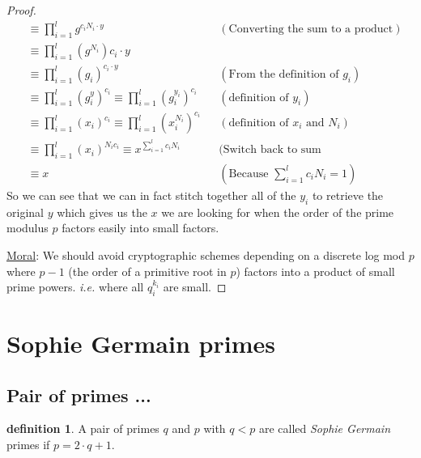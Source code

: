 \documentclass[10pt]{article}
\theoremstyle{definition}
\newtheorem{definition}[theorem]{definition}
\theoremstyle{remark}
\def\ul{\underline}
\begin{document}
\begin{proof}
\begin{align*}
&\equiv \prod_{i=1}^{l}g^{c_iN_i \cdot y} &&(\text{Converting the sum to a product})\\
&\equiv \prod_{i=1}^{l}(g^{N_i}){c_i \cdot y}\\
&\equiv \prod_{i=1}^{l}(g_i)^{c_i \cdot y} &&(\text{From the definition of $g_i$})\\
&\equiv \prod_{i=1}^{l}(g_i^y)^{c_i} \equiv \prod_{i=1}^{l}(g_i^{y_i})^{c_i} &&(\text{definition of $y_i$})\\
&\equiv \prod_{i=1}^{l}(x_i)^{c_i} \equiv \prod_{i=1}^{l}(x_i^{N_i})^{c_i} &&(\text{definition of $x_i$ and $N_i$})\\
&\equiv \prod_{i=1}^{l}(x_i)^{N_ic_i} \equiv x^{\sum_{i=1}^{l}c_iN_i} &&(\text{Switch back to sum}\\
&\equiv x &&(\text{Because $\sum_{i=1}^{l}c_iN_i = 1$})
\end{align*}
So we can see that we can in fact stitch together all of the $y_i$ to retrieve the original $y$ which gives us the $x$ we are looking for when the order of the prime modulus $p$ factors easily into small factors.

\ul{Moral}: We should avoid cryptographic schemes depending on a discrete log mod $p$ where $p-1$ (the order of a primitive root in $p$) factors into a product of small prime powers.  \textit{i.e.} where all $q_i^{k_i}$ are small.
\end{proof}
\section{Sophie Germain primes}
\subsection{Pair of primes ...}
\begin{definition}
A pair of primes $q$ and $p$ with $q<p$ are called \textit{Sophie Germain} primes if $p = 2 \cdot q + 1$.
\end{definition}
\end{document}
